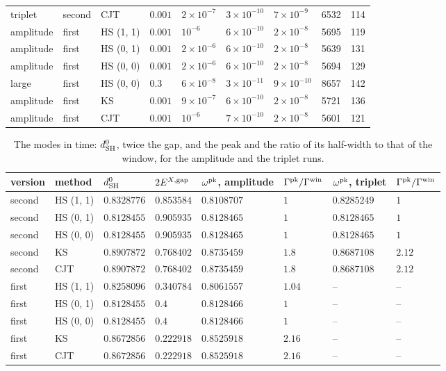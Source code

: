 \documentclass[aps,prd,onecolumn,superscriptaddress,nofootinbib,floatfix,longbibliography]{revtex4-2}
\newcommand{\SH}{{\rm SH}}
\begin{document}
\begin{table}[!htbp]
\begin{tabular}{lllllllll}
triplet & second & CJT & $0.001$ & $2\times10^{-7}$ & $3\times10^{-10}$ & $7\times10^{-9}$ & 6532 & 114 \\
amplitude & first & HS (1, 1) & $0.001$ & $10^{-6}$ & $6\times10^{-10}$ & $2\times10^{-8}$ & 5695 & 119 \\
amplitude & first & HS (0, 1) & $0.001$ & $2\times10^{-6}$ & $6\times10^{-10}$ & $2\times10^{-8}$ & 5639 & 131 \\
amplitude & first & HS (0, 0) & $0.001$ & $2\times10^{-6}$ & $6\times10^{-10}$ & $2\times10^{-8}$ & 5694 & 129 \\
large & first & HS (0, 0) & $0.3$ & $6\times10^{-8}$ & $3\times10^{-11}$ & $9\times10^{-10}$ & 8657 & 142 \\
amplitude & first & KS & $0.001$ & $9\times10^{-7}$ & $6\times10^{-10}$ & $2\times10^{-8}$ & 5721 & 136 \\
amplitude & first & CJT & $0.001$ & $10^{-6}$ & $7\times10^{-10}$ & $2\times10^{-8}$ & 5601 & 121 \\
\hline\hline
\end{tabular}\par
\endgroup
\end{table}

\begin{table}[!htbp]
\caption{\label{tab:modes}The modes in time: $d^0_\SH$, twice the gap, and the peak and the ratio of its half-width to that of the window, for the amplitude and the triplet runs.}
\begingroup\centering\footnotesize\setlength{\tabcolsep}{4pt}
\begin{tabular}{llllllll}
\hline\hline
version & method & $d^0_{\rm SH}$ & $2E^{X,{\rm gap}}$ & $\omega^{\rm pk}$, amplitude & $\Gamma^{\rm pk}/\Gamma^{\rm win}$ & $\omega^{\rm pk}$, triplet & $\Gamma^{\rm pk}/\Gamma^{\rm win}$ \\ \hline
second & HS (1, 1) & $0.8328776$ & $0.853584$ & $0.8108707$ & $1$ & $0.8285249$ & $1$ \\
second & HS (0, 1) & $0.8128455$ & $0.905935$ & $0.8128465$ & $1$ & $0.8128465$ & $1$ \\
second & HS (0, 0) & $0.8128455$ & $0.905935$ & $0.8128465$ & $1$ & $0.8128465$ & $1$ \\
second & KS & $0.8907872$ & $0.768402$ & $0.8735459$ & $1.8$ & $0.8687108$ & $2.12$ \\
second & CJT & $0.8907872$ & $0.768402$ & $0.8735459$ & $1.8$ & $0.8687108$ & $2.12$ \\
first & HS (1, 1) & $0.8258096$ & $0.340784$ & $0.8061557$ & $1.04$ & -- & -- \\
first & HS (0, 1) & $0.8128455$ & $0.4$ & $0.8128466$ & $1$ & -- & -- \\
first & HS (0, 0) & $0.8128455$ & $0.4$ & $0.8128466$ & $1$ & -- & -- \\
first & KS & $0.8672856$ & $0.222918$ & $0.8525918$ & $2.16$ & -- & -- \\
first & CJT & $0.8672856$ & $0.222918$ & $0.8525918$ & $2.16$ & -- & -- \\
\hline\hline
\end{tabular}\par
\endgroup
\end{table}
\end{document}
